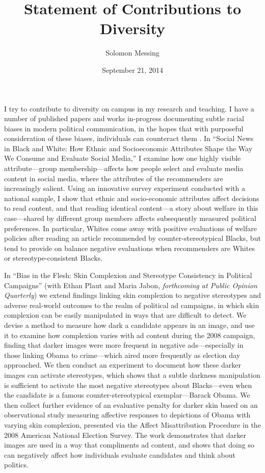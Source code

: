 \documentclass[12pt]{article}
\begin{document}
  
\title{Statement of Contributions to Diversity}
\author{Solomon Messing}
\date{September 21, 2014}
\maketitle 

I try to contribute to diversity on campus in my research and teaching.  I have a number of published papers and works in-progress documenting subtle racial biases in modern political communication, in the hopes that with purposeful consideration of these biases, individuals can counteract them \citep[scientific evidence of this possibility can be be found in][]{devine_regulation_2002}.  In ``Social News in Black and White: How Ethnic and Socioeconomic Attributes Shape the Way We Consume and Evaluate Social Media,'' I examine how one highly visible attribute---group membership---affects how people select and evaluate media content in social media, where the attributes of the recommenders are increasingly salient.  Using an innovative survey experiment conducted with a national sample, I show that ethnic and socio-economic attributes affect decisions to read content, and that reading identical content---a story about welfare in this case---shared by different group members affects subsequently measured political preferences.  In particular, Whites come away with positive evaluations of welfare policies after reading an article recommended by counter-stereotypical Blacks, but tend to provide on balance negative evaluations when recommenders are Whites or stereotype-consistent Blacks.  

In ``Bias in the Flesh: Skin Complexion and Stereotype Consistency in Political Campaigns'' (with Ethan Plaut and Maria Jabon, \emph{forthcoming at Public Opinion Quarterly}) we extend findings linking skin complexion to negative stereotypes and adverse real-world outcomes to the realm of political ad campaigns, in which skin complexion can be easily manipulated in ways that are difficult to detect.  We devise a method to measure how dark a candidate appears in an image, and use it to examine how complexion varies with ad content during the 2008 campaign, finding that darker images were more frequent in negative ads---especially in those linking Obama to crime---which aired more frequently as election day approached.  We then conduct an experiment to document how these darker images can activate stereotypes, which shows that a subtle darkness manipulation is sufficient to activate the most negative stereotypes about Blacks---even when the candidate is a famous counter-stereotypical exemplar---Barack Obama.  We then collect further evidence of an evaluative penalty for darker skin based on an observational study measuring affective responses to depictions of Obama with varying skin complexion, presented via the Affect Misattribution Procedure in the 2008 American National Election Survey.  The work demonstrates that darker images are used in a way that compliments ad content, and shows that doing so can negatively affect how individuals evaluate candidates and think about politics.
\end{document}
